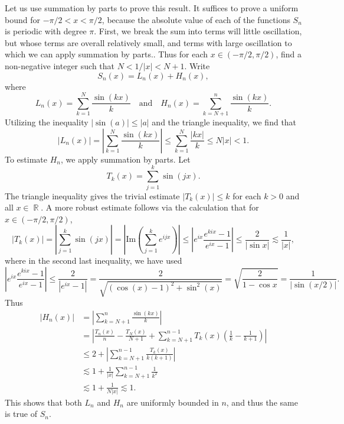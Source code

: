 \documentclass[answers]{exam}
\DeclareMathOperator{\RR}{\mathbb{R}}
\theoremstyle{problemstyle}
\newcommand{\1}[1]{\textbf{1}_{\left[#1\right]}} %
\begin{document}
\begin{questions}
\begin{solution}
Let us use summation by parts to prove this result. It suffices to prove a uniform bound for $-\pi/2 < x < \pi/2$, because the absolute value of each of the functions $S_n$ is periodic with degree $\pi$. First, we break the sum into terms will little oscillation, but whose terms are overall relatively small, and terms with large oscillation to which we can apply summation by parts.. Thus for each $x \in (-\pi/2,\pi/2)$, find a non-negative integer such that $N < 1/|x| < N+1$. Write
%
\[ S_n(x) = L_n(x) + H_n(x), \]
%
where
%
\[ L_n(x) = \sum_{k = 1}^N \frac{\sin(kx)}{k} \quad\text{and}\quad H_n(x) = \sum_{k = N+1}^n \frac{\sin(kx)}{k}. \]
%
Utilizing the inequality $|\sin(a)| \leq |a|$ and the triangle inequality, we find that
%
\begin{equation*}
  |L_n(x)| = \left| \sum_{k=1}^{N}\frac{\sin(kx)}{k} \right|\leq \sum_{k=1}^{N}\frac{|kx|}{k}\leq N|x|<1.
\end{equation*}
%
To estimate $H_n$, we apply summation by parts. Let
%
\[ T_k(x) = \sum_{j = 1}^k \sin(jx). \]
%
The triangle inequality gives the trivial estimate $|T_k(x)| \leq k$ for each $k > 0$ and all $x \in \RR$. A more robust estimate follows via the calculation that for $x \in (-\pi/2,\pi/2)$,
%
\begin{equation*}
  |T_k(x)| = \left| \sum_{j=1}^{k}\sin(jx) \right| = \left| \text{Im} \left( \sum_{j=1}^{k}e^{ijx} \right) \right|\leq \left| e^{ix} \frac{ e^{kix} - 1}{e^{ix} - 1}\right| \leq \frac{2}{|\sin x|} \lesssim \frac{1}{|x|},
\end{equation*}
%
where in the second last inequality, we have used
%
\begin{equation*}
  \left| e^{ix}\frac{e^{kix}-1}{e^{ix}-1} \right|
  \leq \frac{2}{\left| e^{ix}-1 \right|}
  = \frac{2}{\sqrt{( \cos(x)-1 )^{2}+ \sin^{2}(x)}}
  = \sqrt{\frac{2}{1-\cos x}}
  = \frac{1}{|\sin (x/2)|}.
\end{equation*}
%
Thus
%
\begin{align*}
  |H_n(x)| &= \left| \sum_{k=N+1}^{n}\frac{\sin(kx)}{k} \right|\\
          &= \left| \frac{T_n(x)}{n}-\frac{T_N(x)}{N+1} + \sum_{k=N+1}^{n-1}T_k(x) \left(\frac{1}{k}-\frac{1}{k+1}  \right) \right|\\
         &\leq 2 + \left| \sum_{k=N+1}^{n-1}\frac{T_k(x)}{k(k+1)} \right|\\
         &\lesssim 1 + \frac{1}{|x|} \sum_{k = N+1}^{n-1} \frac{1}{k^2}\\
         &\lesssim 1 + \frac{1}{N |x|} \lesssim 1.
\end{align*}
%
This shows that both $L_n$ and $H_n$ are uniformly bounded in $n$, and thus the same is true of $S_n$.


\end{solution}
\end{questions}
\end{document}
